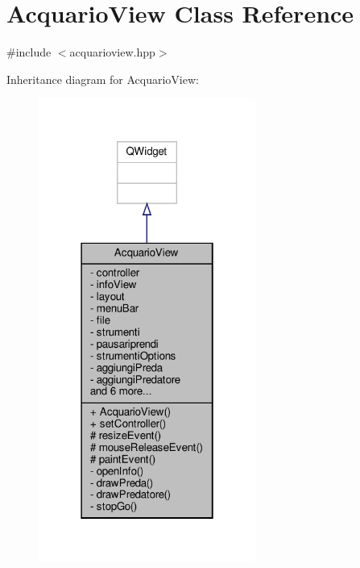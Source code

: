 \hypertarget{classAcquarioView}{}\section{Acquario\+View Class Reference}
\label{classAcquarioView}


{\ttfamily \#include $<$acquarioview.\+hpp$>$}



Inheritance diagram for Acquario\+View\+:\nopagebreak
\begin{figure}[H]
\begin{center}
\leavevmode
\includegraphics[width=202pt]{classAcquarioView__inherit__graph}
\end{center}
\end{figure}


